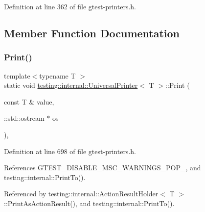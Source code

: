 Definition at line 362 of file gtest-\/printers.\+h.



\subsection{Member Function Documentation}
\mbox{\label{classtesting_1_1internal_1_1UniversalPrinter_aecec021e1abbaa260b701e24e3fe33eb}} 
\subsubsection{\texorpdfstring{Print()}{Print()}}
{\footnotesize\ttfamily template$<$typename T $>$ \\
static void \hyperlink{classtesting_1_1internal_1_1UniversalPrinter}{testing\+::internal\+::\+Universal\+Printer}$<$ T $>$\+::Print (\begin{DoxyParamCaption}\item[{const T \&}]{value,  }\item[{\+::std\+::ostream $\ast$}]{os }\end{DoxyParamCaption})\hspace{0.3cm}{\ttfamily [inline]}, {\ttfamily [static]}}



Definition at line 698 of file gtest-\/printers.\+h.



References G\+T\+E\+S\+T\+\_\+\+D\+I\+S\+A\+B\+L\+E\+\_\+\+M\+S\+C\+\_\+\+W\+A\+R\+N\+I\+N\+G\+S\+\_\+\+P\+O\+P\+\_\+, and testing\+::internal\+::\+Print\+To().



Referenced by testing\+::internal\+::\+Action\+Result\+Holder$<$ T $>$\+::\+Print\+As\+Action\+Result(), and testing\+::internal\+::\+Print\+To().


